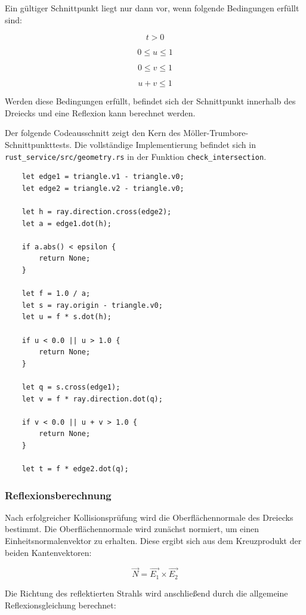 \documentclass{article}
\begin{document}
    Ein gültiger Schnittpunkt liegt nur dann vor, wenn folgende Bedingungen erfüllt sind:

    \[
    t > 0
    \]

    \[
    0 \leq u \leq 1
    \]

    \[
    0 \leq v \leq 1
    \]

    \[
    u + v \leq 1
    \]

    Werden diese Bedingungen erfüllt, befindet sich der Schnittpunkt innerhalb des Dreiecks und eine Reflexion kann berechnet werden.

    \vspace{0.3em}
    Der folgende Codeausschnitt zeigt den Kern des Möller-Trumbore-Schnittpunkttests.
    Die vollständige Implementierung befindet sich in
    \texttt{rust\_service/src/geometry.rs} in der Funktion
    \texttt{check\_intersection}.

    \begin{lstlisting}
    let edge1 = triangle.v1 - triangle.v0;
    let edge2 = triangle.v2 - triangle.v0;

    let h = ray.direction.cross(edge2);
    let a = edge1.dot(h);

    if a.abs() < epsilon {
        return None;
    }

    let f = 1.0 / a;
    let s = ray.origin - triangle.v0;
    let u = f * s.dot(h);

    if u < 0.0 || u > 1.0 {
        return None;
    }

    let q = s.cross(edge1);
    let v = f * ray.direction.dot(q);

    if v < 0.0 || u + v > 1.0 {
        return None;
    }

    let t = f * edge2.dot(q);
    \end{lstlisting}

    \subsubsection{Reflexionsberechnung}

    Nach erfolgreicher Kollisionsprüfung wird die Oberflächennormale des Dreiecks bestimmt. Die Oberflächennormale wird zunächst normiert,
    um einen Einheitsnormalenvektor zu erhalten. Diese ergibt sich aus dem Kreuzprodukt der beiden Kantenvektoren:

    \[
    \vec{N} = \vec{E_1} \times \vec{E_2}
    \]

    Die Richtung des reflektierten Strahls wird anschließend durch die allgemeine Reflexionsgleichung berechnet:
\end{document}

